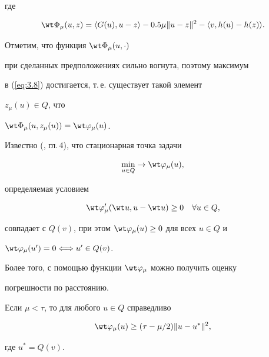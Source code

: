 где


\begin{equation} \label{eq:3.9} 


\wt \Phi_{\mu} (u, z)=\langle G(u), u-z \rangle -


0.5 \mu \| u-z \|^2 - \langle v, h(u) - h(z) \rangle . 


\end{equation}


Отметим, что функция $\wt \Phi_{\mu} (u, \cdot )$ 


при сделанных предположениях сильно вогнута, поэтому максимум 


в (\ref{eq:3.8}) достигается, т.\,е. существует такой элемент 


$z_{\mu} (u) \in Q$, что


$\wt \Phi_{\mu} (u, z_{\mu}(u) )=\wt \varphi_{\mu} (u)$. 


Известно (\cite{Pat99}, гл.\,4), что стационарная точка задачи 


\begin{equation} \label{eq:3.10} 


\min_{u \in Q} \rightarrow \wt \varphi_{\mu} (u),


\end{equation}


определяемая условием 


$$ 


\wt \varphi'_{\mu} (\wt u, u-\wt u) \geq 0 \quad \forall u \in Q, 


$$


совпадает с $Q(v)$, при этом $\wt\varphi_{\mu}(u)\geq 0$ для всех $u\in Q$ и 


$\wt \varphi_{\mu} (u')=0 \Longleftrightarrow u' \in Q(v)$.


Более того, с помощью функции $ \wt \varphi_{\mu}$ можно получить оценку 


погрешности по расстоянию.





\begin{lem}


\label{lm:3.1}


Если $\mu < \tau $, то для любого $u \in Q$ справедливо


\begin{equation} \label{eq:3.11} 


\wt \varphi_{\mu} (u) \geq (\tau - \mu /2) \| u - u^*\|^2, 


\end{equation}


где $u^*=Q(v)$.


\end{lem}





